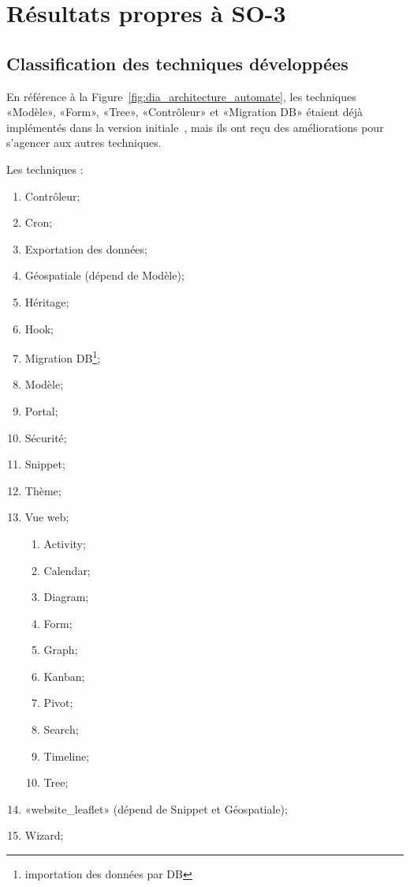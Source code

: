 \section{Résultats propres à SO-3}

\subsection{Classification des techniques développées}\label{result_technique_developpe}

En référence à la Figure~\ref{fig:dia_architecture_automate}, les techniques «Modèle», «Form», «Tree», «Contrôleur» et «Migration DB» étaient déjà implémentés dans la version initiale~\cite{bluiksnot_repo}, mais ils ont reçu des améliorations pour s’agencer aux autres techniques.

Les techniques :
\begin{enumerate}
    \item Contrôleur;
    \item Cron;
    \item Exportation des données;
    \item Géospatiale (dépend de Modèle);
    \item Héritage;
    \item Hook;
    \item Migration DB\footnote{importation des données par DB};
    \item Modèle;
    \item Portal;
    \item Sécurité;
    \item Snippet;
    \item Thème;
    \item Vue web;
    \begin{enumerate}
        \item Activity;
        \item Calendar;
        \item Diagram;
        \item Form;
        \item Graph;
        \item Kanban;
        \item Pivot;
        \item Search;
        \item Timeline;
        \item Tree;
    \end{enumerate}
    \item «website\_leaflet» (dépend de Snippet et Géospatiale);
    \item Wizard;
\end{enumerate}


